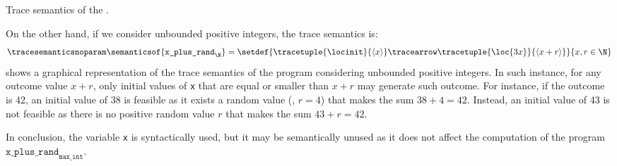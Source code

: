 \begin{example}
\begin{marginfigure}
\begin{tikzpicture}[scale=0.8]
\end{tikzpicture}
\caption{Trace semantics of the .}
\end{marginfigure}
On the other hand, if we consider unbounded positive integers, the trace semantics is:
\begin{align*}
  \tracesemanticsnoparam\semanticsof{\texttt{x\_plus\_rand}_\N}
  =
  \setdef{
    \tracetuple{\locinit}{\langle{x}\rangle}\tracearrow\tracetuple{\loc{3x}}{\langle{x+r}\rangle}
  }{x, r \in \N}
\end{align*}
 shows a graphical representation of the trace semantics of the program  considering unbounded positive integers.
In such instance, for any outcome value $x+r$, only initial values of \texttt{x} that are equal or smaller than $x+r$ may generate such outcome.
For instance, if the outcome is 42, an initial value of 38 is feasible as it exists a random value (\eg, $r = 4$) that makes the sum $38 + 4 = 42$. Instead, an initial value of 43 is not feasible as there is no positive random value $r$ that makes the sum $43 + r = 42$.

In conclusion, the variable \texttt{x} is syntactically used, but it may be semantically unused as it does not affect the computation of the program $\texttt{x\_plus\_rand}_{\texttt{max\_int}}$.

\end{example}

